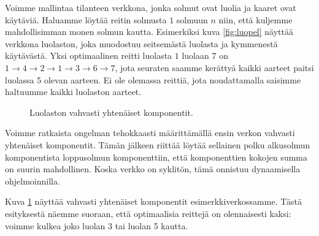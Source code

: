 Voimme mallintaa tilanteen verkkona, jonka solmut ovat luolia ja
kaaret ovat käytäviä. Haluamme löytää reitin solmusta $1$ solmuun $n$
niin, että kuljemme mahdollisimman monen solmun kautta.
Esimerkiksi kuva \ref{fig:luopel} näyttää verkkona luolaston, joka muodostuu
seitsemästä luolasta ja kymmenestä käytävästä.
Yksi optimaalinen reitti luolasta $1$ luolaan $7$ on
$1 \rightarrow 4 \rightarrow 2 \rightarrow 1 \rightarrow 3 \rightarrow 6 \rightarrow 7$,
jota seuraten saamme kerättyä kaikki aarteet paitsi luolassa 5 olevan aarteen.
Ei ole olemassa reittiä, jota noudattamalla saisimme haltuumme kaikki luolaston aarteet.

\begin{figure}
\center
\begin{center}
\end{center}
\caption{Luolaston vahvasti yhtenäiset komponentit.}
\label{fig:luovah}
\end{figure}

Voimme ratkaista ongelman tehokkaasti määrittämällä ensin verkon
vahvasti yhtenäiset komponentit.
Tämän jälkeen riittää löytää sellainen polku alkusolmun komponentista
loppusolmun komponenttiin, että komponenttien kokojen summa
on suurin mahdollinen.
Koska verkko on syklitön, tämä onnistuu dynaamisella ohjelmoinnilla.

Kuva \ref{fig:luovah} näyttää vahvasti yhtenäiset komponentit
esimerkkiverkossamme.
Tästä esityksestä näemme suoraan, että optimaalisia reittejä on olennaisesti kaksi:
voimme kulkea joko luolan 3 tai luolan 5 kautta.